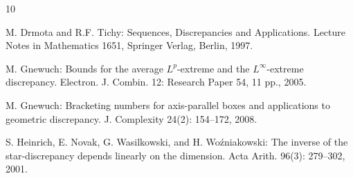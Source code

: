 \documentclass[12pt]{article}
\theoremstyle{remark}
\theoremstyle{definition}
\newcommand{\<}{\langle}
\renewcommand{\>}{\rangle}
\begin{document}
\begin{thebibliography}{10}






 M. Drmota and R.F. Tichy: Sequences, Discrepancies and Applications. Lecture Notes in Mathematics 1651, Springer Verlag, Berlin, 1997.

 M. Gnewuch: Bounds for the average \(L^p\)-extreme and the \(L^\infty\)-extreme discrepancy. Electron. J. Combin. 12: Research Paper 54, 11 pp., 2005.

 M. Gnewuch: Bracketing numbers for axis-parallel boxes and applications to geometric discrepancy. 
J. Complexity 24(2): 154--172, 2008.



 S. Heinrich, E. Novak, G. Wasilkowski, and H. Wo\'{z}niakowski: The inverse of the star-discrepancy depends linearly on the dimension. Acta Arith. 96(3): 279--302, 2001.



\end{thebibliography}
\end{document}
